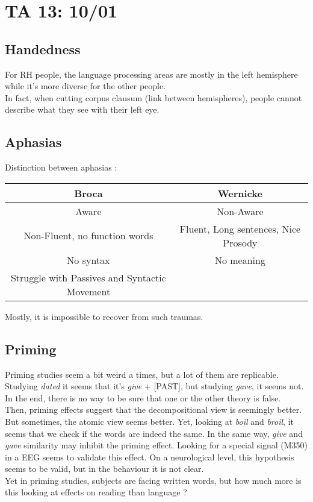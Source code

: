 \documentclass{cours}
\begin{document}
\section{TA 13\!: 10/01}
\subsection{Handedness}
For RH people, the language processing areas are mostly in the left hemisphere while it's more diverse for the other people.\\
In fact, when cutting corpus clausum (link between hemispheres), people cannot describe what they see with their left eye.\\

\subsection{Aphasias}
Distinction between aphasias : 
\begin{center}
    \begin{tabular}{c|c}
        \toprule
        Broca & Wernicke\\
        \midrule
        Aware & Non-Aware\\
        Non-Fluent, no function words & Fluent, Long sentences, Nice Prosody\\
        No syntax & No meaning\\
        Struggle with Passives and Syntactic Movement & \\
        \bottomrule
    \end{tabular}
\end{center}
Mostly, it is impossible to recover from such traumas. 

\subsection{Priming}
Priming studies seem a bit weird a times, but a lot of them are replicable. \\
Studying \textsl{dated} it seems that it's \textsl{give} + [PAST], but studying \textsl{gave}, it seems not. In the end, there is no way to be sure that one or the other theory is false. \\
Then, priming effects suggest that the decompositional view is seemingly better. But sometimes, the atomic view seems better. Yet, looking at \textsl{boil} and \textsl{broil}, it seems that we check if the words are indeed the same. In the same way, \textsl{give} and \textsl{gave} similarity may inhibit the priming effect. Looking for a special signal (M350) in a EEG seems to validate this effect. On a neurological level, this hypothesis seems to be valid, but in the behaviour it is not clear. \\
Yet in priming studies, subjects are facing written words, but how much more is this looking at effects on reading than language ? 
\end{document}
